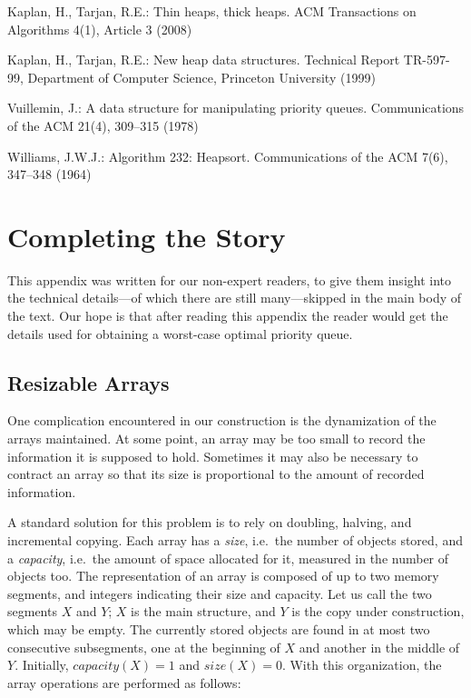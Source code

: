 \documentclass{llncs}
\begin{document}
\begin{thebibliography}{10}
Kaplan, H., Tarjan, R.E.: Thin heaps, thick heaps. ACM Transactions on
  Algorithms  4(1),  Article 3 (2008)

Kaplan, H., Tarjan, R.E.: New heap data structures. Technical Report TR-597-99,
  Department of Computer Science, Princeton University (1999)

Vuillemin, J.: A data structure for manipulating priority queues.
  Communications of the ACM  21(4),  309--315 (1978)

Williams, J.W.J.: Algorithm 232: {H}eapsort. Communications of the ACM  7(6),
  347--348 (1964)


\end{thebibliography}


\newpage
\appendix
\section{Completing the Story}

This appendix was written for our non-expert readers, to give them
insight into the technical details---of which there are still
many---skipped in the main body of the text.  Our hope is that after
reading this appendix the reader would get the details 
used for obtaining a worst-case optimal priority queue.

\subsection{Resizable Arrays}

One complication encountered in our construction is the dynamization
of the arrays maintained. At some point, an array may be too small to
record the information it is supposed to hold. Sometimes it may also
be necessary to contract an array so that its size is proportional to
the amount of recorded information.

A standard solution for this problem is to rely on doubling, halving,
and incremental copying. Each array has a \emph{size}, i.e.~the number
of objects stored, and a \emph{capacity}, i.e.~the amount of space
allocated for it, measured in the number of objects too. The
representation of an array is composed of up to two memory segments, and
integers indicating their size and capacity. Let us call
the two segments $X$ and $Y$; $X$ is the main structure, and $Y$ is the
copy under construction, which may be empty. The currently stored
objects are found in at most two consecutive subsegments, one at the
beginning of $X$ and another in the middle of $Y$. Initially,
$\mathit{capacity}(X) = 1$ and $\mathit{size}(X) = 0$. With this organization,
the array operations are performed as follows:
\end{document}
